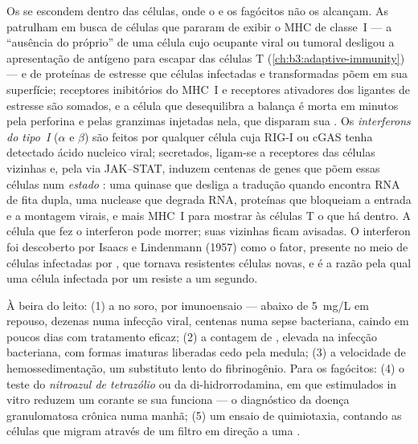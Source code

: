 \begin{definition}\label{def:b3:innate-immunity:nk-ifn}
Os  se escondem dentro das células, onde o  e os
fagócitos não os alcançam. As \emph{} patrulham
em busca de células que pararam de exibir o MHC de classe~I --- a
``ausência do próprio'' de uma célula cujo ocupante viral ou tumoral
desligou a apresentação de antígeno para escapar das células T
(\cref{ch:b3:adaptive-immunity}) --- e de proteínas de estresse que
células infectadas e transformadas põem em sua superfície; receptores
inibitórios do MHC~I e receptores ativadores dos ligantes de estresse
são somados, e a célula que desequilibra a balança é morta em minutos
pela perforina e pelas granzimas injetadas nela, que disparam sua
. Os \emph{interferons do tipo~I} ($\alpha$ e $\beta$) são
feitos por qualquer célula cuja RIG-I ou cGAS tenha detectado ácido
nucleico viral; secretados, ligam-se a receptores das células vizinhas
e, pela via JAK--STAT, induzem centenas de genes que põem essas células
num \emph{estado }: uma quinase que desliga a tradução quando
encontra RNA de fita dupla, uma nuclease que degrada RNA, proteínas que
bloqueiam a entrada e a montagem virais, e mais MHC~I para mostrar às
células T o que há dentro. A célula que fez o interferon pode morrer;
suas vizinhas ficam avisadas. O interferon foi descoberto por Isaacs e
Lindenmann (1957) como o fator, presente no meio de células infectadas
por , que tornava resistentes células novas, e é a razão pela qual
uma célula infectada por um  resiste a um segundo.
\end{definition}

\begin{method}\label{met:b3:innate-immunity:tests}
À beira do leito: (1) a \emph{} no soro, por
imunoensaio --- abaixo de \qty{5}{mg/L} em repouso, dezenas numa
infecção viral, centenas numa sepse bacteriana, caindo em poucos dias
com tratamento eficaz; (2) a contagem de , elevada na
infecção bacteriana, com formas imaturas liberadas cedo pela medula;
(3) a velocidade de hemossedimentação, um substituto lento do
fibrinogênio. Para os fagócitos: (4) o teste do \emph{nitroazul de
tetrazólio} ou da di-hidrorrodamina, em que  estimulados in
vitro reduzem um corante se sua  funciona --- o
diagnóstico da doença granulomatosa crônica numa manhã; (5) um ensaio
de quimiotaxia, contando as células que migram através de um filtro em
direção a uma .
\end{method}

